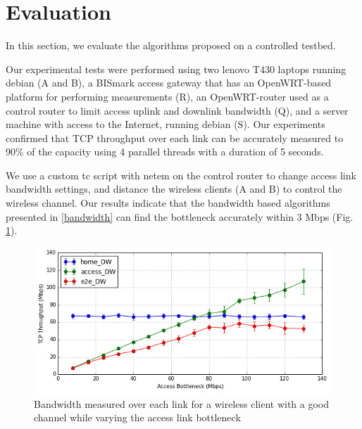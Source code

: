 \section{Evaluation}
\label{evaluation} 
In this section, we evaluate the algorithms proposed on a controlled testbed.

Our experimental tests were performed using two lenovo T430 laptops running debian (A and B), a BISmark access gateway \cite{sundaresan2011broadband} that has an OpenWRT-based platform for performing measurements (R), an OpenWRT-router used as a control router to limit access uplink and downlink bandwidth (Q), and a server machine with access to the Internet, running debian (S). Our experiments confirmed that TCP throughput over each link can be accurately measured to 90\% of the capacity using 4 parallel threads with a duration of 5 seconds.

We use a custom tc script with netem \cite{netem} on the control router to change access link bandwidth settings, and distance the wireless clients (A and B) to control the wireless channel. Our results indicate that the bandwidth based algorithms presented in \ref{bandwidth} can find the bottleneck accurately within 3 Mbps (Fig. \ref{fig:throughput_vs_bottleneck}).

\begin{figure}[!ht]
  \centering
  \includegraphics[width=\linewidth]{figures/tcp_throughput_vs_bottleneck.png}
  \caption{Bandwidth measured over each link for a wireless client with a good channel while varying the access link bottleneck}
  \label{fig:throughput_vs_bottleneck}
\end{figure}



